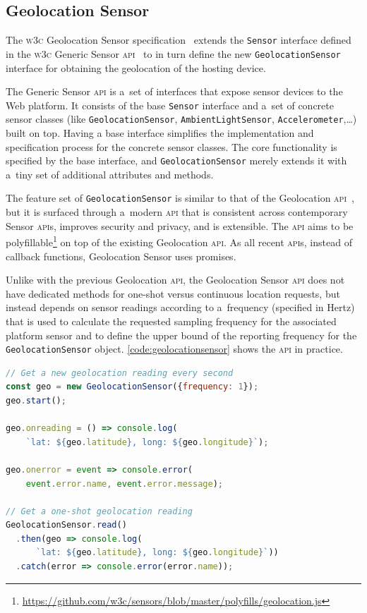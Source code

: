 \documentclass[sigconf,hyphens]{acmart}
\begin{document}
\subsection{Geolocation Sensor}

The \textsc{w3c} Geolocation Sensor specification~\cite{kostiainen2018geolocation}
extends the \texttt{Sensor} interface defined in the
\textsc{w3c} Generic Sensor \textsc{api}~\cite{waldron2018genericsensor}
to in turn define the new \texttt{GeolocationSensor} interface
for obtaining the geolocation of the hosting device.

The Generic Sensor \textsc{api} is a~set of interfaces that expose sensor devices to the Web platform.
It consists of the base \texttt{Sensor} interface and a~set of concrete sensor classes
(like \texttt{GeolocationSensor}, \texttt{AmbientLightSensor}, \texttt{Accelerometer},\ldots) built on top.
Having a base interface simplifies the implementation and specification process for the concrete sensor classes.
The core functionality is specified by the base interface, and \texttt{GeolocationSensor}
merely extends it with a~tiny set of additional attributes and methods.

The feature set of \texttt{GeolocationSensor} is similar
to that of the Geolocation \textsc{api}~\cite{raskin2010geolocation},
but it is surfaced through a~modern \textsc{api} that is consistent across contemporary Sensor \textsc{api}s,
improves security and privacy, and is extensible.
The \textsc{api} aims to be
polyfillable\footnote{\url{https://github.com/w3c/sensors/blob/master/polyfills/geolocation.js}}
on top of the existing Geolocation \textsc{api}.
As all recent \textsc{api}s, instead of callback functions, Geolocation Sensor uses promises.

Unlike with the previous Geolocation \textsc{api}, the Geolocation Sensor \textsc{api}
does not have dedicated methods for one-shot versus continuous location requests,
but instead depends on sensor readings according to a~frequency (specified in Hertz) that is used
to calculate the requested sampling frequency for the associated platform sensor
and to define the upper bound of the reporting frequency for the \texttt{GeolocationSensor} object.
\autoref{code:geolocationsensor} shows the \textsc{api} in practice.

\begin{lstlisting}[caption={Geolocation Sensor \textsc{api}},
  label=code:geolocationsensor, language=JavaScript, float=h] 
// Get a new geolocation reading every second
const geo = new GeolocationSensor({frequency: 1});
geo.start();

geo.onreading = () => console.log(
    `lat: ${geo.latitude}, long: ${geo.longitude}`);

geo.onerror = event => console.error(
    event.error.name, event.error.message);

// Get a one-shot geolocation reading
GeolocationSensor.read()
  .then(geo => console.log(
      `lat: ${geo.latitude}, long: ${geo.longitude}`))
  .catch(error => console.error(error.name));
\end{lstlisting}
\end{document}
